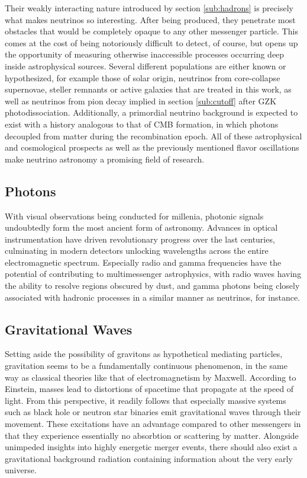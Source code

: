 Their weakly interacting nature introduced by section \ref{sub:hadrons} is precisely what makes neutrinos so interesting. After
being produced, they penetrate most obstacles that would be completely opaque to any other messenger particle. This comes at the
cost of being notoriously difficult to detect, of course, but opens up the opportunity of measuring otherwise inaccessible processes
occurring deep inside astrophysical sources. Several different populations are either known or hypothesized, for example
those of solar origin, neutrinos from core-collapse supernovae, steller remnants or active galaxies that are treated in this work,
as well as neutrinos from pion decay implied in section \ref{sub:cutoff} after GZK photodissociation. Additionally, a primordial
neutrino background is expected to exist with a history analogous to that of CMB formation, in which photons decoupled
from matter during the recombination epoch. All of these astrophysical and cosmological prospects as well as the previously
mentioned flavor oscillations make neutrino astronomy a promising field of research.



\subsection{Photons}
\label{sub:photons}

With visual observations being conducted for millenia, photonic signals undoubtedly form the most ancient form of astronomy.
Advances in optical instrumentation have driven revolutionary progress over the last centuries, culminating in modern detectors
unlocking wavelengths across the entire electromagnetic spectrum. Especially radio and gamma frequencies have the potential of
contributing to multimessenger astrophysics, with radio waves having the ability to resolve regions obscured by dust, and gamma
photons being closely associated with hadronic processes in a similar manner as neutrinos, for instance.



\subsection{Gravitational Waves}
\label{sub:gravitational}

Setting aside the possibility of gravitons as hypothetical mediating particles, gravitation seems to be a fundamentally continuous
phenomenon, in the same way as classical theories like that of electromagnetism by Maxwell. According to Einstein, masses lead to
distortions of spacetime that propagate at the speed of light. From this perspective, it readily follows that especially massive
systems such as black hole or neutron star binaries emit gravitational waves through their movement. These excitations have an
advantage compared to other messengers in that they experience essentially no absorbtion or scattering by matter. Alongside unimpeded insights
into highly energetic merger events, there should also exist a gravitational background radiation containing information about
the very early universe.



